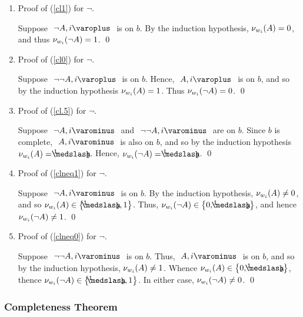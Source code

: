 \begin{proof*}
\begin{enumerate}
	\setcounter{enumi}{\value{enumi_saved}}
	\item Proof of (\ref{cl1}) for $ \neg $.

		Suppose $ \like{ \dNode{ \neg A }{ i } } $ is on $ b $.
		By the induction hypothesis, $ \mathcal{\nu}_{ w_i }({ A }) = 0 $, and thus $ \mathcal{\nu}_{ w_i }({ \neg A }) = 1 $.
		\qed
		
	\item Proof of (\ref{cl0}) for $ \neg $.
		
		Suppose $ \like{ \dNodei{ \neg \neg A }} $ is on $ b $.
		Hence, $ \like{ \dNodei{ A }} $ is on $b$, and so by the induction hypothesis $ \mathcal{\nu}_{ w_i }({ A }) = 1 $.
		Thus $ \mathcal{\nu}_{ w_i }({ \neg A }) = 0 $.
		\qed
	
	\item Proof of (\ref{cl.5}) for $ \neg $.
	
		Suppose $ \like{ \uNodei{ \neg A }} $ and $ \like{ \uNodei{ \neg \neg A }} $ are on $b$.
		Since $b$ is complete, $ \like{ \uNodei{ A }} $ is also on $b$, and so by the induction hypothesis $ \Valwi{ A } = \oneHalf $.
		Hence, $ \Valwi{ \neg A } = \oneHalf $.
		\qed
		
	\item Proof of (\ref{clneq1}) for $ \neg $.
	
		Suppose $ \like{ \uNodei{ \neg A }} $ is on $ b $.
		By the induction hypothesis, $ \mathcal{\nu}_{ w_i }({ A }) \neq 0 $, and so $ \Valwi{ A } \in \set{ \oneHalf, 1 } $.
		Thus, $ \Valwi{ \neg A } \in \set{0, \oneHalf} $, and hence $ \mathcal{\nu}_{ w_i }({ \neg A }) \neq 1 $.
		\qed
	
	\item Proof of (\ref{clneq0}) for $ \neg $.
	
		Suppose $ \like{ \uNodei{ \neg \neg A }} $ is on $ b $.
		Thus, $ \like{ \uNodei{ A }} $ is on $ b $, and so by the induction hypothesis, $ \mathcal{\nu}_{ w_i }({ A }) \neq 1$.
		Whence $ \Valwi{ A } \in \set{0, \oneHalf}$, thence $ \Valwi{ \neg A } \in \set{\oneHalf, 1} $.
		In either case, $ \mathcal{\nu}_{ w_i }({ \neg A }) \neq 0 $.
		\qed		
	
	
\end{enumerate}

\end{proof*}

\pagebreak

\subsubsection{Completeness Theorem}

